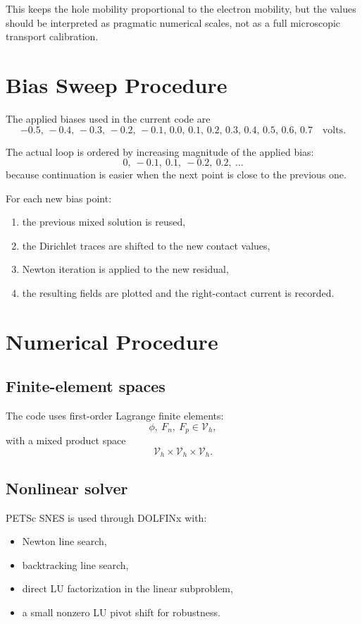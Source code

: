 \documentclass[11pt]{article}
\begin{document}
This keeps the hole mobility proportional to the electron mobility, but the
values should be interpreted as pragmatic numerical scales, not as a full
microscopic transport calibration.

\section{Bias Sweep Procedure}

The applied biases used in the current code are
\[
    -0.5,\,-0.4,\,-0.3,\,-0.2,\,-0.1,\,
    0.0,\,
    0.1,\,0.2,\,0.3,\,0.4,\,0.5,\,0.6,\,0.7
    \quad \text{volts}.
\]

The actual loop is ordered by increasing magnitude of the applied bias:
\[
    0,\ -0.1,\ 0.1,\ -0.2,\ 0.2,\ \dots
\]
because continuation is easier when the next point is close to the previous one.

For each new bias point:
\begin{enumerate}
    \item the previous mixed solution is reused,
    \item the Dirichlet traces are shifted to the new contact values,
    \item Newton iteration is applied to the new residual,
    \item the resulting fields are plotted and the right-contact current is recorded.
\end{enumerate}

\section{Numerical Procedure}

\subsection{Finite-element spaces}

The code uses first-order Lagrange finite elements:
\[
    \phi,\ F_n,\ F_p \in \mathcal{V}_h,
\]
with a mixed product space
\[
    \mathcal{V}_h \times \mathcal{V}_h \times \mathcal{V}_h.
\]

\subsection{Nonlinear solver}

PETSc SNES is used through DOLFINx with:
\begin{itemize}
    \item Newton line search,
    \item backtracking line search,
    \item direct LU factorization in the linear subproblem,
    \item a small nonzero LU pivot shift for robustness.
\end{itemize}
\end{document}

